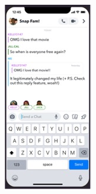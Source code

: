 \documentclass{article}
\begin{document}
\begin{figure}[h]
\begin{minipage}{0.15\textwidth}
        \label{fig:image1}
    \end{minipage}
    \begin{minipage}{0.15\textwidth} 
        \includegraphics[width=\linewidth]{chat.jpg}

\end{minipage}
\end{figure}
\end{document}
